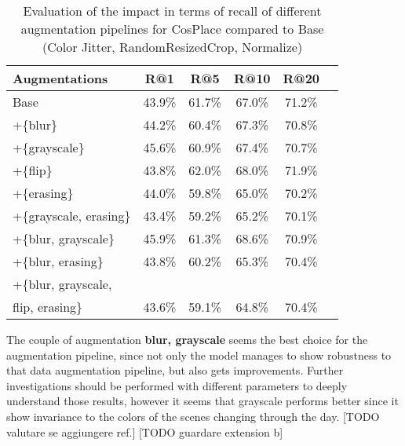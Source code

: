 \documentclass[10pt,twocolumn,letterpaper]{article}
\begin{document}
\begin{table}[hbp] %
\centering %
\begin{tabular}{l c c c c c} %
\toprule %
Augmentations & R@1 & R@5 & R@10 & R@20\\ %
\midrule %
Base & 43.9\%  & 61.7\% & 67.0\% & 71.2\%  \\ 
+\{blur\} & 44.2\%  & 60.4\% & 67.3\% & 70.8\%  \\ 
+\{grayscale\} & 45.6\%  & 60.9\% & 67.4\% & 70.7\%  \\ 
+\{flip\} & 43.8\%  & 62.0\% & 68.0\% & 71.9\%  \\  
+\{erasing\} & 44.0\%  & 59.8\% & 65.0\% & 70.2\%  \\  
+\{grayscale, erasing\} & 43.4\%  & 59.2\% & 65.2\% & 70.1\%  \\  
+\{blur, grayscale\} & 45.9\%  & 61.3\% & 68.6\% & 70.9\%  \\  
+\{blur, erasing\} & 43.8\%  & 60.2\% & 65.3\% & 70.4\%  \\  
+\{blur, grayscale,\\ flip, erasing\} & 43.6\%  & 59.1\% & 64.8\% & 70.4\%  \\  

\bottomrule %
\end{tabular}
\smallskip 
\caption{Evaluation of the impact in terms of recall of different augmentation pipelines for CosPlace compared to Base (Color Jitter, RandomResizedCrop, Normalize)
} %
\label{tab:augmentations-pp} %
\end{table}

The couple of augmentation \textbf{blur, grayscale} seems the best choice for the augmentation pipeline, since not only the model manages to show robustness to that data augmentation pipeline, but also gets improvements.
Further investigations should be performed with different parameters to deeply understand those results, however it seems that grayscale performs better since it show invariance to the colors of the scenes changing through the day. [TODO valutare se aggiungere ref.]
[TODO guardare extension b]
\newline
\end{document}

